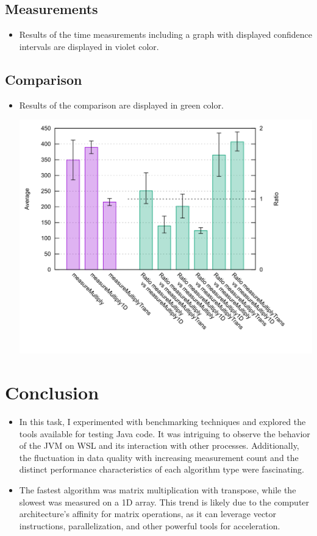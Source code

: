 \documentclass[onecolumn, conference]{IEEEtran}
\newcommand{\conciseItem}{\itemsep1pt \parskip0pt \parsep0pt}
\begin{document}
\subsection{Measurements}
\begin{itemize}
	\conciseItem
	\item Results of the time measurements including a graph with displayed confidence intervals are displayed in violet color.
\end{itemize}
\subsection{Comparison}
\begin{itemize}
	\conciseItem
	\item Results of the comparison are displayed in green color.
	
	\includegraphics[width=1\textwidth]{graph.png}
\end{itemize}


\section{Conclusion}
\begin{itemize}
	\conciseItem
	\item In this task, I experimented with benchmarking techniques and explored the tools available for testing Java code. It was intriguing to observe the behavior of the JVM on WSL and its interaction with other processes. Additionally, the fluctuation in data quality with increasing measurement count and the distinct performance characteristics of each algorithm type were fascinating.
	\item The fastest algorithm was matrix multiplication with transpose, while the slowest was measured on a 1D array. This trend is likely due to the computer architecture's affinity for matrix operations, as it can leverage vector instructions, parallelization, and other powerful tools for acceleration.
\end{itemize}
\end{document}
